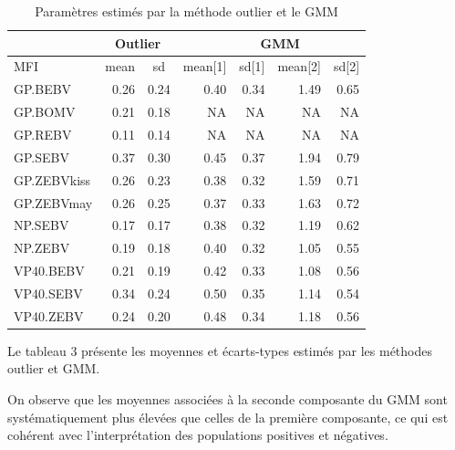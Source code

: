 \documentclass[a4paper]{article}
\begin{document}
\begin{table} [H]

\caption{Paramètres estimés par la méthode outlier et le GMM}
\centering
\begin{tabular}{|l|rc|rrrr|}
\hline
 & \multicolumn{2}{c|}{Outlier} & & \multicolumn{2}{c}{GMM} & \\ \hline
MFI & mean & sd & mean{[}1{]} & \multicolumn{1}{r|}{sd{[}1{]}} & mean{[}2{]} & sd{[}2{]} \\ \hline
GP.BEBV     & 0.26          & 0.24         & 0.40        & \multicolumn{1}{r|}{0.34}      & 1.49        & 0.65      \\
GP.BOMV     & 0.21          & 0.18         & NA          & \multicolumn{1}{r|}{NA}        & NA          & NA        \\
GP.REBV     & 0.11          & 0.14         & NA          & \multicolumn{1}{r|}{NA}        & NA          & NA        \\
GP.SEBV     & 0.37          & 0.30         & 0.45        & \multicolumn{1}{r|}{0.37}      & 1.94        & 0.79      \\
GP.ZEBVkiss & 0.26          & 0.23         & 0.38        & \multicolumn{1}{r|}{0.32}      & 1.59        & 0.71      \\
GP.ZEBVmay  & 0.26          & 0.25         & 0.37        & \multicolumn{1}{r|}{0.33}      & 1.63        & 0.72      \\
NP.SEBV     & 0.17          & 0.17         & 0.38        & \multicolumn{1}{r|}{0.32}      & 1.19        & 0.62      \\
NP.ZEBV     & 0.19          & 0.18         & 0.40        & \multicolumn{1}{r|}{0.32}      & 1.05        & 0.55      \\
VP40.BEBV   & 0.21          & 0.19         & 0.42        & \multicolumn{1}{r|}{0.33}      & 1.08        & 0.56      \\
VP40.SEBV   & 0.34          & 0.24         & 0.50        & \multicolumn{1}{r|}{0.35}      & 1.14        & 0.54      \\
VP40.ZEBV   & 0.24          & 0.20         & 0.48        & \multicolumn{1}{r|}{0.34}      & 1.18        & 0.56      \\ \hline
\end{tabular}
\end{table}

Le tableau 3 présente les moyennes et écarts-types estimés par les méthodes outlier et GMM.

On observe que les moyennes associées à la seconde composante du GMM sont systématiquement plus élevées que celles de la première composante, ce qui est cohérent avec l’interprétation des populations positives et négatives.
\end{document}

